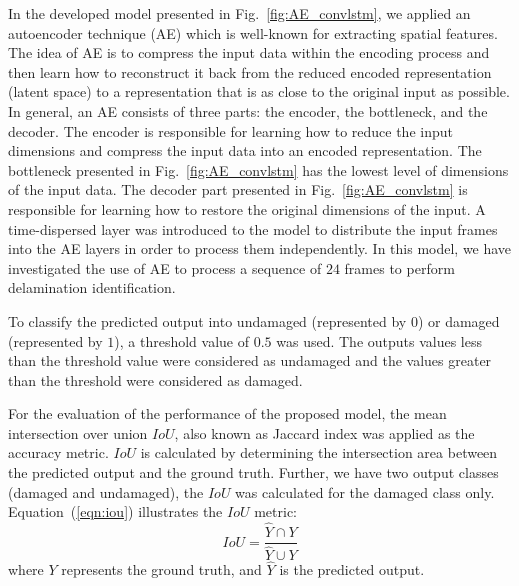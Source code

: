 \documentclass{IOS-Book-Article}
\begin{document}
In the developed model presented in Fig.~\ref{fig:AE_convlstm}, we applied an autoencoder technique (AE) which is well-known for extracting spatial features. 
The idea of AE is to compress the input data within the encoding process and then learn how to reconstruct it back from the reduced encoded representation (latent space) to a representation that is as close to the original input as possible. 
In general, an AE consists of three parts: the encoder, the bottleneck, and the decoder.
The encoder is responsible for learning how to reduce the input dimensions and compress the input data into an encoded representation.
The bottleneck presented in Fig.~\ref{fig:AE_convlstm} has the lowest level of dimensions of the input data.
The decoder part presented in Fig.~\ref{fig:AE_convlstm} is responsible for learning how to restore the original dimensions of the input.
A time-dispersed layer was introduced to the model to distribute the input frames into the AE layers in order to process them independently.
In this model, we have investigated the use of AE to process a sequence of \(24\) frames to perform delamination identification.

To classify the predicted output into undamaged (represented by \(0\)) or 
damaged (represented by \(1\)), a threshold value of \(0.5\) was used. 
The outputs values less than the threshold value were considered as undamaged 
and the values greater than the threshold were considered as damaged.

For the evaluation of the performance of the proposed model, the mean 
intersection over union \(IoU\), also known as Jaccard index was applied as the 
accuracy metric. 
\(IoU\) is calculated by determining the intersection area between the 
predicted output and the ground truth. 
Further, we have two output classes (damaged and undamaged), the \(IoU\) was 
calculated for the damaged class only. 
Equation~(\ref{eqn:iou}) illustrates the \(IoU\) metric: 
\begin{equation}
	IoU=\frac{\hat{Y} \cap Y}{\hat{Y} \cup Y}
	\label{eqn:iou}
\end{equation}
where \(Y\) represents the ground truth, and \(\hat{Y}\) is the predicted 
output.
\end{document}
